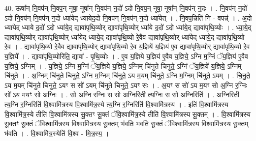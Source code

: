 \documentclass[17pt]{extarticle}
\begin{document}
40. ऊषा᳚न् नि॒वप॑न् नि॒वप॒न् नूषा॒ नूषा᳚न् नि॒वप॑न् न॒दो॑ ऽदो नि॒वप॒न् नूषा॒ नूषा᳚न् नि॒वप॑न् न॒दः । . नि॒वप॑न् न॒दो॑ ऽदो नि॒वप॑न् नि॒वप॑न् न॒दो ध्या॑येद् ध्यायेद॒दो नि॒वप॑न् नि॒वप॑न् न॒दो ध्या॑येत् । . नि॒वप॒न्निति॑ नि - वपन्न्॑ । . अ॒दो ध्या॑येद् ध्याये द॒दो॑ ऽदो ध्या॑ये॒द् द्यावा॑पृथि॒व्योर् द्यावा॑पृथि॒व्योर् ध्या॑ये द॒दो॑ ऽदो ध्या॑ये॒द् द्यावा॑पृथि॒व्योः । . ध्या॒ये॒द् द्यावा॑पृथि॒व्योर् द्यावा॑पृथि॒व्योर् ध्या॑येद् ध्याये॒द् द्यावा॑पृथि॒व्यो रे॒वैव द्यावा॑पृथि॒व्योर् ध्या॑येद् ध्याये॒द् द्यावा॑पृथि॒व्यो रे॒व । . द्यावा॑पृथि॒व्यो रे॒वैव द्यावा॑पृथि॒व्योर् द्यावा॑पृथि॒व्यो रे॒व य॒ज्ञिये॑ य॒ज्ञिय॑ ए॒व द्यावा॑पृथि॒व्योर् द्यावा॑पृथि॒व्यो रे॒व य॒ज्ञिये᳚ । . द्यावा॑पृथि॒व्योरिति॒ द्यावा᳚ - पृ॒थि॒व्योः । . ए॒व य॒ज्ञिये॑ य॒ज्ञिय॑ ए॒वैव य॒ज्ञिये॒ ऽग्नि म॒ग्निं ॅय॒ज्ञिय॑ ए॒वैव य॒ज्ञिये॒ ऽग्निम् । . य॒ज्ञिये॒ ऽग्नि म॒ग्निं ॅय॒ज्ञिये॑ य॒ज्ञिये॒ ऽग्निम् चि॑नुते चिनुते॒ ऽग्निं ॅय॒ज्ञिये॑ य॒ज्ञिये॒ ऽग्निम् चि॑नुते । . अ॒ग्निम् चि॑नुते चिनुते॒ ऽग्नि म॒ग्निम् चि॑नुते॒ ऽय म॒यम् चि॑नुते॒ ऽग्नि म॒ग्निम् चि॑नुते॒ ऽयम् । . चि॒नु॒ते॒ ऽय म॒यम् चि॑नुते चिनुते॒ ऽयꣳ स सो॑ ऽयम् चि॑नुते चिनुते॒ ऽयꣳ सः । . अ॒यꣳ स सो॑ ऽय म॒यꣳ सो अ॒ग्नि र॒ग्निः सो॑ ऽय म॒यꣳ सो अ॒ग्निः । . सो अ॒ग्नि र॒ग्निः स सो अ॒ग्निरिती त्य॒ग्निः स सो अ॒ग्निरिति॑ । . अ॒ग्निरिती त्य॒ग्नि र॒ग्निरिति॑ वि॒श्वामि॑त्रस्य वि॒श्वामि॑त्र॒स्ये त्य॒ग्नि र॒ग्निरिति॑ वि॒श्वामि॑त्रस्य । . इति॑ वि॒श्वामि॑त्रस्य वि॒श्वामि॑त्र॒स्ये तीति॑ वि॒श्वामि॑त्रस्य सू॒क्तꣳ सू॒क्तं ॅवि॒श्वामि॑त्र॒स्ये तीति॑ वि॒श्वामि॑त्रस्य सू॒क्तम् । . वि॒श्वामि॑त्रस्य सू॒क्तꣳ सू॒क्तं ॅवि॒श्वामि॑त्रस्य वि॒श्वामि॑त्रस्य सू॒क्तम् भ॑वति भवति सू॒क्तं ॅवि॒श्वामि॑त्रस्य वि॒श्वामि॑त्रस्य सू॒क्तम् भ॑वति । . वि॒श्वामि॑त्र॒स्येति॑ वि॒श्व - मि॒त्र॒स्य॒ । \newline
\pagebreak
{}
\end{document}
